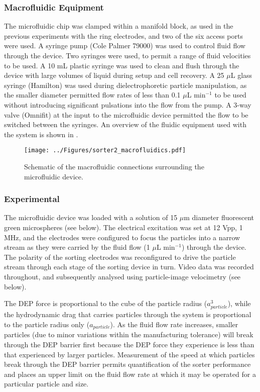 \subsubsection{Macrofluidic Equipment}

The microfluidic chip was clamped within a manifold block, as used in the previous experiments with the ring electrodes, and two of the six access ports were used. A syringe pump (Cole Palmer 79000) was used to control fluid flow through the device. Two syringes were used, to permit a range of fluid velocities to be used. A 10 mL plastic syringe was used to clean and flush through the device with large volumes of liquid during setup and cell recovery. A 25 $\mu$L glass syringe (Hamilton) was used during dielectrophoretic particle manipulation, as the smaller diameter permitted flow rates of less than 0.1 $\mu$L min$^{-1}$ to be used without introducing significant pulsations into the flow from the pump. A 3-way valve (Omnifit) at the input to the microfluidic device permitted the flow to be switched between the syringes. An overview of the fluidic equipment used with the system is shown in .

\begin{figure}
 \centering
 \texttt{[image: ../Figures/sorter2\_macrofluidics.pdf]}
 \caption{Schematic of the macrofluidic connections surrounding the microfluidic device.}
 \label{fig:sorter2_macrofluidics}
\end{figure}


\subsubsection{Experimental}

The microfluidic device was loaded with a solution of 15 $\mu$m diameter fluorescent green microspheres (see below). The electrical excitation was set at 12 Vpp, 1 MHz, and the electrodes were configured to focus the particles into a narrow stream as they were carried by the fluid flow (1 $\mu$L min$^{-1}$) through the device. The polarity of the sorting electrodes was reconfigured to drive the particle stream through each stage of the sorting device in turn. Video data was recorded throughout, and subsequently analysed using particle-image velocimetry (see below).

The DEP force is proportional to the cube of the particle radius ($a_{particle}^{3}$), while the hydrodynamic drag that carries particles through the system is proportional to the particle radius only ($a_{particle}$). As the fluid flow rate increases, smaller particles (due to minor variations within the manufacturing tolerance) will break through the DEP barrier first because the DEP force they experience is less than that experienced by larger particles. Measurement of the speed at which particles break through the DEP barrier permits quantification of the sorter performance and places an upper limit on the fluid flow rate at which it may be operated for a particular particle and size.

